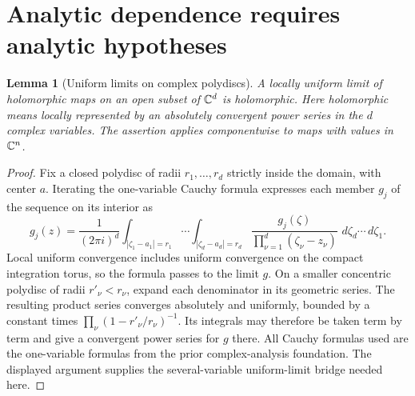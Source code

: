 \documentclass[11pt,oneside]{book}
\newtheorem{lemma}[theorem]{Lemma}
\theoremstyle{definition}
\theoremstyle{remark}\newtheorem{remark}[theorem]{Remark}
\newcommand{\dd}{\,d}\newcommand{\id}{\operatorname{id}}
\begin{document}
\section{Analytic dependence requires analytic hypotheses}
\begin{lemma}[Uniform limits on complex polydiscs]\label{d13:06:polydisc-limit}
A locally uniform limit of holomorphic maps on an open subset of
$\mathbb C^d$ is holomorphic. Here holomorphic means locally represented by
an absolutely convergent power series in the $d$ complex variables.
The assertion applies componentwise to maps with values in $\mathbb C^n$.
\end{lemma}
\begin{proof}
Fix a closed polydisc of radii $r_1,\ldots,r_d$ strictly inside the
domain, with center $a$. Iterating the one-variable Cauchy formula
expresses each member $g_j$ of the sequence on its interior as
\[
 g_j(z)=\frac{1}{(2\pi i)^d}
 \int_{|\zeta_1-a_1|=r_1}\cdots
 \int_{|\zeta_d-a_d|=r_d}
 \frac{g_j(\zeta)}{\prod_{\nu=1}^d(\zeta_\nu-z_\nu)}
 \,\dd\zeta_d\cdots\dd\zeta_1.
\]
Local uniform convergence includes uniform convergence on the compact
integration torus, so the formula passes to the limit $g$. On a
smaller concentric polydisc of radii $r'_\nu<r_\nu$, expand each
denominator in its geometric series. The resulting product series
converges absolutely and uniformly, bounded by a constant times
$\prod_\nu(1-r'_\nu/r_\nu)^{-1}$. Its integrals may therefore be
taken term by term and give a convergent power series for $g$ there.
All Cauchy formulas used are the one-variable formulas from the prior
complex-analysis foundation. The displayed argument supplies the
several-variable uniform-limit bridge needed here.
\end{proof}
\end{document}
